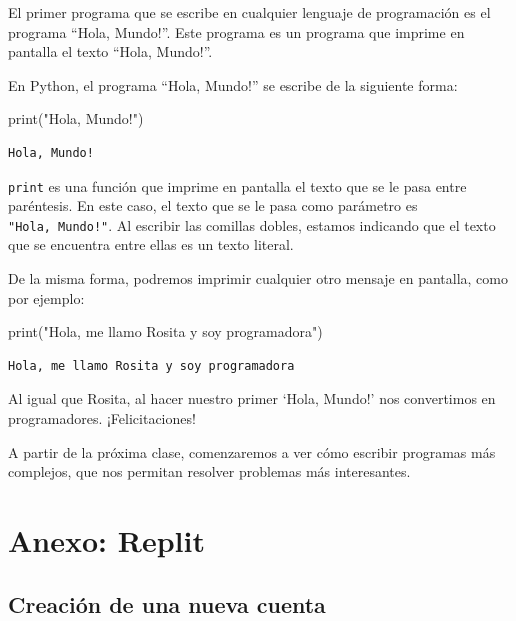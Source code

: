 \documentclass[
  letterpaper,
  DIV=11,
  numbers=noendperiod]{scrreprt}
\newenvironment{Shaded}{\begin{snugshade}}{\end{snugshade}}
\newcommand{\BuiltInTok}[1]{\textcolor[rgb]{0.00,0.23,0.31}{#1}}
\newcommand{\NormalTok}[1]{\textcolor[rgb]{0.00,0.23,0.31}{#1}}
\newcommand{\StringTok}[1]{\textcolor[rgb]{0.13,0.47,0.30}{#1}}
\begin{document}
El primer programa que se escribe en cualquier lenguaje de programación
es el programa ``Hola, Mundo!''. Este programa es un programa que
imprime en pantalla el texto ``Hola, Mundo!''.

En Python, el programa ``Hola, Mundo!'' se escribe de la siguiente
forma:

\begin{Shaded}
\begin{Highlighting}[]
\BuiltInTok{print}\NormalTok{(}\StringTok{"Hola, Mundo!"}\NormalTok{)}
\end{Highlighting}
\end{Shaded}

\begin{verbatim}
Hola, Mundo!
\end{verbatim}

\texttt{print} es una función que imprime en pantalla el texto que se le
pasa entre paréntesis. En este caso, el texto que se le pasa como
parámetro es \texttt{"Hola,\ Mundo!"}. Al escribir las comillas dobles,
estamos indicando que el texto que se encuentra entre ellas es un texto
literal.

De la misma forma, podremos imprimir cualquier otro mensaje en pantalla,
como por ejemplo:

\begin{Shaded}
\begin{Highlighting}[]
\BuiltInTok{print}\NormalTok{(}\StringTok{"Hola, me llamo Rosita y soy programadora"}\NormalTok{)}
\end{Highlighting}
\end{Shaded}

\begin{verbatim}
Hola, me llamo Rosita y soy programadora
\end{verbatim}

Al igual que Rosita, al hacer nuestro primer `Hola, Mundo!' nos
convertimos en programadores. ¡Felicitaciones!

A partir de la próxima clase, comenzaremos a ver cómo escribir programas
más complejos, que nos permitan resolver problemas más interesantes.

\hypertarget{anexo-replit}{%
\section{Anexo: Replit}\label{anexo-replit}}

\hypertarget{creaciuxf3n-de-una-nueva-cuenta}{%
\subsection{Creación de una nueva
cuenta}\label{creaciuxf3n-de-una-nueva-cuenta}}
\end{document}
